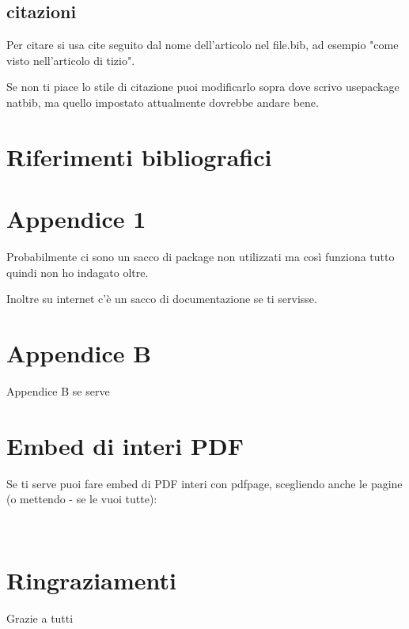 \documentclass[12pt,a4paper,twoside]{book}
\begin{document}
\section{citazioni}
Per citare si usa cite seguito dal nome dell'articolo nel file.bib, ad esempio "come visto nell'articolo di tizio\cite{greenwade93}".

Se non ti piace lo stile di citazione puoi modificarlo sopra dove scrivo usepackage natbib, ma quello impostato attualmente dovrebbe andare bene.



\renewcommand{\bibsection}{}
\chapter*{Riferimenti bibliografici}

\newpage

\renewcommand{\appendixtocname}{Appendici}
\renewcommand{\appendixpagename}{Appendici}
{}
\begin{appendices}
\chapter{Appendice 1}
\label{Appendice:A}
Probabilmente ci sono un sacco di package non utilizzati ma così funziona tutto quindi non ho indagato oltre.

Inoltre su internet c'è un sacco di documentazione se ti servisse.
\chapter{Appendice B}
\label{Appendice:B}
Appendice B se serve

\chapter{Embed di interi PDF}
\label{Appendice:C}
Se ti serve puoi fare embed di PDF interi con pdfpage, scegliendo anche le pagine (o mettendo - se le vuoi tutte):


\end{appendices}

\newpage~\newpage
\chapter*{Ringraziamenti}
Grazie a tutti
\end{document}
